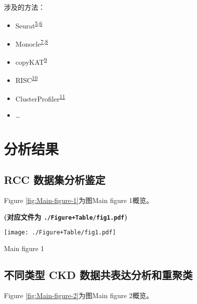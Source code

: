 \documentclass[
]{article}
\providecommand{\tightlist}{%
  \setlength{\itemsep}{0pt}\setlength{\parskip}{0pt}}
\begin{document}
涉及的方法：

\begin{itemize}
\tightlist
\item
  Seurat\textsuperscript{\protect\hyperlink{ref-IntegratedAnalHaoY2021}{5},\protect\hyperlink{ref-ComprehensiveIStuart2019}{6}}
\item
  Monocle\textsuperscript{\protect\hyperlink{ref-ReversedGraphQiuX2017}{7},\protect\hyperlink{ref-TheDynamicsAnTrapne2014}{8}}
\item
  copyKAT\textsuperscript{\protect\hyperlink{ref-DelineatingCopGaoR2021}{9}}
\item
  RISC\textsuperscript{\protect\hyperlink{ref-RobustIntegratLiuY2021}{10}}
\item
  ClusterProfiler\textsuperscript{\protect\hyperlink{ref-ClusterprofilerWuTi2021}{11}}
\item
  \ldots{}
\end{itemize}

\hypertarget{results}{%
\section{分析结果}\label{results}}

\hypertarget{rcc-ux6570ux636eux96c6ux5206ux6790ux9274ux5b9a}{%
\subsection{RCC 数据集分析鉴定}\label{rcc-ux6570ux636eux96c6ux5206ux6790ux9274ux5b9a}}

Figure \ref{fig:Main-figure-1}为图Main figure 1概览。

\textbf{(对应文件为 \texttt{./Figure+Table/fig1.pdf})}

\def\@captype{figure}
\begin{center}
\texttt{[image: ./Figure+Table/fig1.pdf]}
\caption{Main figure 1}\label{fig:Main-figure-1}
\end{center}

\hypertarget{ux4e0dux540cux7c7bux578b-ckd-ux6570ux636eux5171ux8868ux8fbeux5206ux6790ux548cux91cdux805aux7c7b}{%
\subsection{不同类型 CKD 数据共表达分析和重聚类}\label{ux4e0dux540cux7c7bux578b-ckd-ux6570ux636eux5171ux8868ux8fbeux5206ux6790ux548cux91cdux805aux7c7b}}

Figure \ref{fig:Main-figure-2}为图Main figure 2概览。
\end{document}
